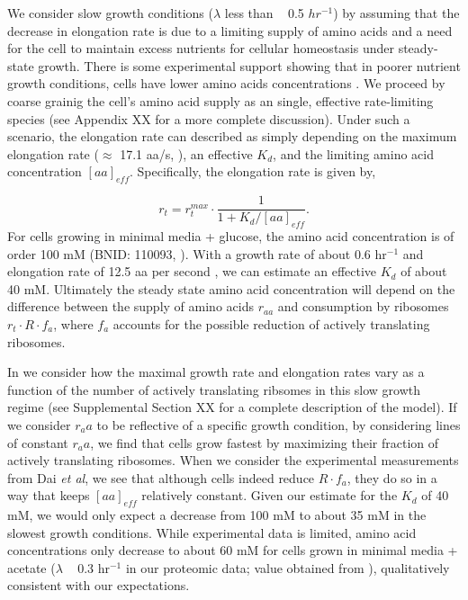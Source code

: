 We consider slow growth conditions ($\lambda$ less than ~ 0.5 $hr^{-1}$) by
assuming that the decrease in elongation rate is due to a
limiting supply of amino acids and a need for the cell to maintain excess
nutrients for cellular homeostasis under steady-state growth. There is some
experimental support showing that in poorer nutrient growth conditions, cells
have lower amino acids concentrations  \citep{bennett2009}. We proceed by coarse
grainig the cell's amino acid supply as an single, effective rate-limiting
species (see Appendix XX for a more complete discussion). Under such a scenario,
the elongation rate can described as simply depending on the maximum elongation
rate ($\approx$ 17.1 aa/s, \citep{dai2016, dai2018}), an effective $K_d$, and
the limiting amino acid concentration $[aa]_{eff}$. Specifically, the elongation
rate is given by,

\begin{equation}
r_t = r_t^{max} \cdot \frac{1}{1 + K_d / [aa]_{eff}}.
\label{eq:rate_Kd}
\end{equation}
For cells growing in minimal media + glucose, the amino acid concentration is of
order 100 mM  (BNID: 110093, \citep{milo2010, bennett2009}). With a growth rate
of about 0.6 hr$^{-1}$ and elongation rate of 12.5 aa per second
\citep{dai2016}, we can estimate an effective $K_d$ of about 40 mM. Ultimately
the steady state amino acid concentration will depend on the difference between
the supply of amino acids $r_{aa}$ and consumption by ribosomes $r_t \cdot R
\cdot f_a$, where $f_a$ accounts for the possible reduction of actively
translating ribosomes.

In  we consider how the maximal growth rate and
elongation rates vary as a function of the number of actively translating
ribsomes in this slow growth regime (see Supplemental Section XX for a complete
description of the model). If we consider $r_aa$ to be reflective of a specific
growth condition, by considering lines of constant $r_aa$, we find that cells
grow fastest by maximizing their fraction of actively translating ribosomes.
When we consider the experimental measurements from Dai \textit{et al}, we see
that although cells indeed reduce $R \cdot f_a$, they do so in a way that keeps
$[aa]_{eff}$ relatively constant. Given our estimate for the $K_d$ of 40 mM,  we
would only expect a decrease from 100 mM to about 35 mM in the slowest growth
conditions. While experimental data is limited, amino acid concentrations only
decrease to about 60 mM for cells grown in minimal media + acetate ($\lambda$ ~
0.3 hr$^{-1}$ in our proteomic data; value obtained from \cite{bennett2009}), qualitatively consistent with our expectations.

